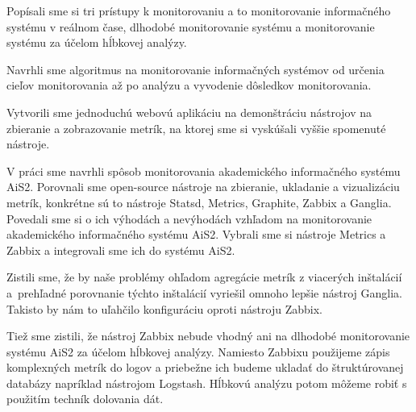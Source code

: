 \documentclass[a4paper, upjsfrontpage, disablespecwarning, thesismargins, thesislinespacing]{rnthesis}
\begin{document}
Popísali sme si tri prístupy k monitorovaniu a to monitorovanie informačného systému v reálnom čase, dlhodobé monitorovanie systému a monitorovanie systému za účelom hĺbkovej analýzy.

Navrhli sme algoritmus na monitorovanie informačných systémov od určenia cieľov monitorovania až po analýzu a vyvodenie dôsledkov monitorovania.

Vytvorili sme jednoduchú webovú aplikáciu na demonštráciu nástrojov na zbieranie a zobrazovanie metrík, na ktorej sme si vyskúšali vyššie spomenuté nástroje.

V práci sme navrhli spôsob monitorovania akademického informačného systému AiS2.
Porovnali sme open-source nástroje na zbieranie, ukladanie a vizualizáciu metrík, konkrétne sú to nástroje Statsd, Metrics, Graphite, Zabbix a Ganglia.
Povedali sme si o ich výhodách a nevýhodách vzhľadom na monitorovanie akademického informačného systému AiS2.
Vybrali sme si nástroje Metrics a Zabbix a integrovali sme ich do systému AiS2.

Zistili sme, že by naše problémy ohľadom agregácie metrík z viacerých inštalácií a~prehľadné porovnanie týchto inštalácií vyriešil omnoho lepšie nástroj Ganglia.
Takisto by nám to uľahčilo konfiguráciu oproti nástroju Zabbix.

Tiež sme zistili, že nástroj Zabbix nebude vhodný ani na dlhodobé monitorovanie systému AiS2 za účelom hĺbkovej analýzy.
Namiesto Zabbixu použijeme zápis komplexných metrík do logov a priebežne ich budeme ukladať do štruktúrovanej databázy napríklad nástrojom Logstash.
Hĺbkovú analýzu potom môžeme robiť s použitím techník dolovania dát.





\end{document}
